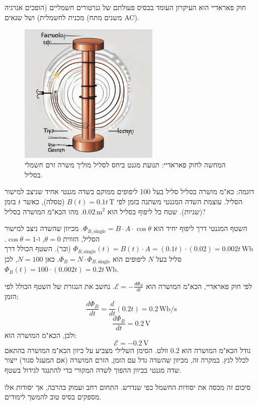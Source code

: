 \documentclass[12pt]{article}
\begin{document}
חוק פאראדיי הוא העיקרון העומד בבסיס פעולתם של גנרטורים חשמליים (הופכים אנרגיה מכנית לחשמלית) ושל שנאים (משנים מתח AC).

\begin{figure}[H]
  \centering
  \includegraphics[width=0.6\textwidth]{files/electromagnetism_induction.png}
  \caption{המחשה לחוק פאראדיי: תנועת מגנט ביחס לסליל מוליך משרה זרם חשמלי בסליל.}
\end{figure}

\begin{exampleBox}{דוגמה: כא"מ מושרה בסליל}
סליל בעל 100 ליפופים ממוקם בשדה מגנטי אחיד שניצב למישור הסליל. עוצמת השדה המגנטי משתנה בזמן לפי \(B(t) = 0.1t \, \text{T}\) (טסלה), כאשר \(t\) בזמן (שניות). שטח כל ליפוף בסליל הוא \(0.02 \, \text{m}^2\). מהו הכא"מ המושרה בסליל?

השטף המגנטי דרך ליפוף יחיד הוא \(\Phi_{B, \text{single}} = B \cdot A \cdot \cos\theta\). מכיוון שהשדה ניצב למישור הסליל, הזווית \(\theta = 0\), ו-\(\cos\theta = 1\).
\(\Phi_{B, \text{single}}(t) = B(t) \cdot A = (0.1t) \cdot (0.02) = 0.002t \, \text{Wb}\) (ובר).
השטף הכולל דרך סליל בעל \(N\) ליפופים הוא \(\Phi_B = N \cdot \Phi_{B, \text{single}}\).
כאן \(N = 100\), לכן \(\Phi_B(t) = 100 \cdot (0.002t) = 0.2t \, \text{Wb}\).

לפי חוק פאראדיי, הכא"מ המושרה הוא \(\mathcal{E} = - \frac{d\Phi_B}{dt}\).
נחשב את הנגזרת של השטף הכולל לפי הזמן:
\[\frac{d\Phi_B}{dt} = \frac{d}{dt}(0.2t) = 0.2 \, \text{Wb}/\text{s}\]
\[\frac{d\Phi_B}{dt} = 0.2 \, \text{V}\]
ולכן, הכא"מ המושרה הוא:
\[\mathcal{E} = -0.2 \, \text{V}\]
גודל הכא"מ המושרה הוא \(0.2\) וולט. הסימן השלילי מצביע על כיוון הכא"מ המושרה בהתאם לכלל לנץ. במקרה זה, מכיוון שהשדה גדל עם הזמן, הזרם המושרה (אם המעגל סגור) ייצור שדה מגנטי בכיוון ההפוך לשדה המקורי כדי להתנגד לגידול בשטף.
\end{exampleBox}

סיכום זה מכסה את יסודות החשמל כפי שנדרש. התחום רחב ועמוק בהרבה, אך יסודות אלו מספקים בסיס טוב להמשך לימודים.
\end{document}
